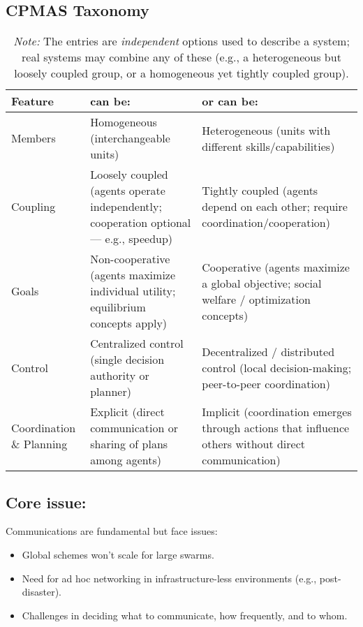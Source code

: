 \subsection*{CPMAS Taxonomy}
\begin{table}[h!]
\centering
\renewcommand{\arraystretch}{1.2}
\begin{tabularx}{\textwidth}{@{}l|X|X@{}}
\toprule
\textbf{Feature} & \textbf{can be:} & \textbf{or can be:} \\ \midrule
Members & Homogeneous (interchangeable units) & Heterogeneous (units with different skills/capabilities) \\ \addlinespace
Coupling & Loosely coupled (agents operate independently; cooperation optional — e.g., speedup) & Tightly coupled (agents depend on each other; require coordination/cooperation) \\ \addlinespace
Goals & Non-cooperative (agents maximize individual utility; equilibrium concepts apply) & Cooperative (agents maximize a global objective; social welfare / optimization concepts) \\ \addlinespace
Control & Centralized control (single decision authority or planner) & Decentralized / distributed control (local decision-making; peer-to-peer coordination) \\ \addlinespace
Coordination \& Planning & Explicit (direct communication or sharing of plans among agents) & Implicit (coordination emerges through actions that influence others without direct communication) \\
\end{tabularx}
\caption{\small\emph{Note:} The entries are \emph{independent} options used to describe a system; real systems may combine any of these (e.g., a heterogeneous but loosely coupled group, or a homogeneous yet tightly coupled group).}
\label{tab:multiagent-taxonomy}
\end{table}

\subsection*{Core issue:} Communications are fundamental but face issues:

\begin{itemize}
    \item Global schemes won't scale for large swarms.
    \item Need for ad hoc networking in infrastructure-less environments (e.g., post-disaster).
    \item Challenges in deciding what to communicate, how frequently, and to whom.
\end{itemize}

